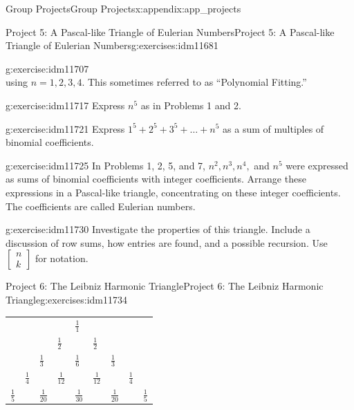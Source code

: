 \documentclass[oneside,10pt,]{book}
\numberwithin{equation}{chapter}
\begin{document}
\begin{appendixptx}{Group Projects}{}{Group Projects}{}{}{x:appendix:app_projects}
\begin{exercises-section-numberless}{Project 5: A Pascal-like Triangle of Eulerian Numbers}{}{Project 5: A Pascal-like Triangle of Eulerian Numbers}{}{}{g:exercises:idm11681}
\begin{divisionexercise}{7}{}{}{g:exercise:idm11707}
\begin{equation*}
\end{equation*}
using \(n=1, 2, 3, 4\). This sometimes referred to as ``Polynomial Fitting.''%
\end{divisionexercise}%
\begin{divisionexercise}{8}{}{}{g:exercise:idm11717}%
Express \(n^{5}\) as in Problems 1 and 2.%
\end{divisionexercise}%
\begin{divisionexercise}{9}{}{}{g:exercise:idm11721}%
Express \(1^{5} + 2^{5} + 3^{5} + \ldots + n^{5}\) as a sum of multiples of binomial coefficients.%
\end{divisionexercise}%
\begin{divisionexercise}{10}{}{}{g:exercise:idm11725}%
In Problems 1, 2, 5, and 7, \(n^{2},n^{3},n^{4},\) and \(n^{5}\) were expressed as sums of binomial coefficients with integer coefficients. Arrange these expressions in a Pascal-like triangle, concentrating on these integer coefficients. The coefficients are called Eulerian numbers.%
\end{divisionexercise}%
\begin{divisionexercise}{11}{}{}{g:exercise:idm11730}%
Investigate the properties of this triangle. Include a discussion of row sums, how entries are found, and a possible recursion. Use \(\begin{bmatrix}
n\\
k
\end{bmatrix}\) for notation.%
\end{divisionexercise}%
\end{exercises-section-numberless}
%
%
\typeout{************************************************}
\typeout{************************************************}
%
\begin{exercises-section-numberless}{Project 6: The Leibniz Harmonic Triangle}{}{Project 6: The Leibniz Harmonic Triangle}{}{}{g:exercises:idm11734}
\begin{sidebyside}{1}{0}{0}{0}%
\begin{sbspanel}{1}%
{\centering%
\begin{tabular}{lllllllll}
&&&&\(\frac{1}{1}\)&&&&\tabularnewline[0pt]
&&&\(\frac{1}{2}\)&&\(\frac{1}{2}\)&&&\tabularnewline[0pt]
&&\(\frac{1}{3}\)&&\(\frac{1}{6}\)&&\(\frac{1}{3}\)&&\tabularnewline[0pt]
&\(\frac{1}{4}\)&&\(\frac{1}{12}\)&&\(\frac{1}{12}\)&&\(\frac{1}{4}\)&\tabularnewline[0pt]
\(\frac{1}{5}\)&&\(\frac{1}{20}\)&&\(\frac{1}{30}\)&&\(\frac{1}{20}\)&&\(\frac{1}{5}\)
\end{tabular}
}
\end{sbspanel}
\end{sidebyside}
\end{exercises-section-numberless}
\end{appendixptx}
\end{document}
